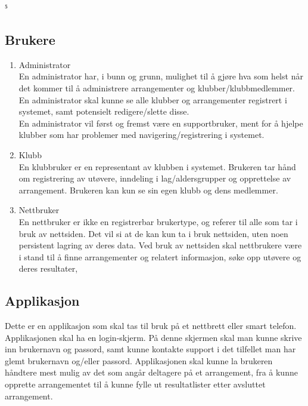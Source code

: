 ⁵\documentclass[norsk]{article}
\begin{document}
\subsection{Brukere}
\begin{enumerate}
    \item Administrator\\
    En administrator har, i bunn og grunn, mulighet til å gjøre hva som helst når det kommer til å administrere arrangementer og klubber/klubbmedlemmer. En administrator skal kunne se alle klubber og arrangementer registrert i systemet, samt potensielt redigere/slette disse.\\
    En administrator vil først og fremst være en supportbruker, ment for å hjelpe klubber som har problemer med navigering/registrering i systemet.
    \item Klubb\\
    En klubbruker er en representant av klubben i systemet. Brukeren tar hånd om registrering av utøvere, inndeling i lag/aldersgrupper og opprettelse av arrangement. Brukeren kan kun se sin egen klubb og dens medlemmer.
    \item Nettbruker\\
    En nettbruker er ikke en registrerbar brukertype, og referer til alle som tar i bruk av nettsiden. Det vil si at de kan kun ta i bruk nettsiden, uten noen persistent lagring av deres data. Ved bruk av nettsiden skal nettbrukere være i stand til å finne arrangementer og relatert informasjon, søke opp utøvere og deres resultater,
\end{enumerate}

\subsection{Applikasjon}
Dette er en applikasjon som skal tas til bruk på et nettbrett eller smart telefon. Applikasjonen skal ha en login-skjerm. På denne skjermen skal man kunne skrive inn brukernavn og passord, samt kunne kontakte support i det tilfellet man har glemt brukernavn og/eller passord. Applikasjonen skal kunne la brukeren håndtere mest mulig av det som angår deltagere på et arrangement, fra å kunne opprette arrangementet til å kunne fylle ut resultatlister etter avsluttet arrangement. 
\end{document}
